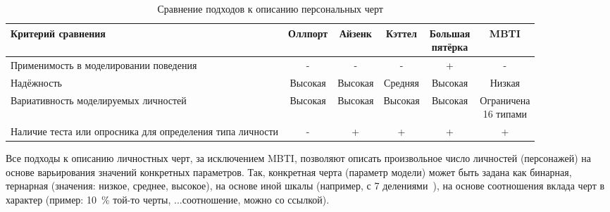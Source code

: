 \begin{table}[!h]
	\begin{center}
		\small
		\begin{threeparttable}
			\caption{Сравнение подходов к описанию персональных черт}
			\label{tbl:exist_sol}
			\begin{tabular}{|p{5cm}|c|c|c|c|c|}
				\hline
				Критерий сравнения & Оллпорт & Айзенк & Кэттел & \makecell{Большая \\ пятёрка} & MBTI   \\
				\hline
				Применимость в моделировании поведения & - & - & - & + & - \\ 
				\hline
				Надёжность & Высокая & Высокая & Средняя & Высокая & Низкая \\ 
				\hline
				Вариативность моделируемых личностей & Высокая & Высокая & Высокая & Высокая & \makecell{Ограничена \\ 16 типами} \\ 
				\hline
				Наличие теста или опросника для определения типа личности & - & + & + & + & + \\
				\hline
			\end{tabular}
		\end{threeparttable}			
	\end{center}
\end{table}

Все подходы к описанию личностных черт, за исключением MBTI, позволяют описать произвольное число личностей (персонажей) на основе варьирования значений конкретных параметров. Так, конкретная черта (параметр модели) может быть задана как бинарная, тернарная (значения: низкое, среднее, высокое), на основе иной шкалы (например, с 7 делениями~\cite{}), на основе соотношения вклада черт в характер (пример: 10~\% той-то черты, ...соотношение, можно со ссылкой). %



